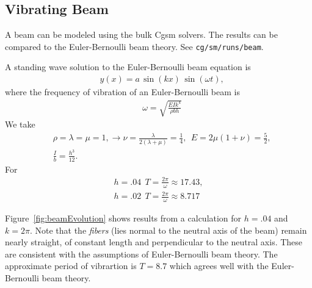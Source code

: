 \clearpage
\subsection{Vibrating Beam} \label{sec:beam}


A beam can be modeled using the bulk Cgsm solvers. The results can be compared to the Euler-Bernoulli beam theory.
See {\tt cg/sm/runs/beam}. 

A standing wave solution to the Euler-Bernoulli beam equation is
\begin{align*}
 &  y(x) = a\, \sin( k x )\,\sin( \omega t) , 
\end{align*} 
where the frequency of vibration of an Euler-Bernoulli beam  is
\begin{align*}
 &  \omega = \sqrt{ \frac{E I k^4}{\rho b h} }
\end{align*}
We take
\begin{align*}
&  \rho=\lambda=\mu=1, \rightarrow \nu = \frac{\lambda}{2(\lambda+\mu)} =\frac{1}{4}, ~~E=2\mu(1+\nu) = \frac{5}{2}, \\
&  \frac{I}{b} = \frac{h^3}{12} .
\end{align*}
For
\begin{align*}
  h=.04 ~~ T=\frac{2\pi}{\omega} \approx 17.43, \\
  h=.02 ~~ T=\frac{2\pi}{\omega} \approx 8.717
\end{align*}


Figure~\ref{fig:beamEvolution} shows results from a calculation for $h=.04$ and $k=2\pi$. 
Note that the {\em fibers} (lies normal to the neutral axis of the beam) remain nearly straight, of constant length and
perpendicular to the neutral axis. These are consistent with the assumptions of Euler-Bernoulli beam theory.
The approximate 
period of vibrartion is $T=8.7$ which agrees well with the Euler-Bernoulli beam theory.


